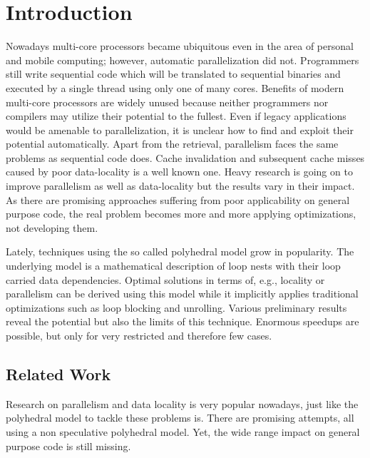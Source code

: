 
\chapter{Introduction} %
\label{Chapter1}



Nowadays multi-core processors became ubiquitous even in the area of personal and 
mobile computing; however, automatic parallelization did not. 
Programmers still write sequential code which will be
translated to sequential binaries and executed by a single thread using only
one of many cores. %
Benefits of modern multi-core processors are widely unused because neither programmers 
nor compilers may utilize their potential to the fullest.
Even if legacy applications would be amenable to parallelization, it is unclear 
how to find and exploit their potential automatically.  
Apart from the retrieval, parallelism faces the same problems as sequential
code does. Cache invalidation and subsequent cache misses 
caused by poor data-locality is a well known one. 
Heavy research is going on to improve parallelism as well as  data-locality 
but the results vary in their impact.
As there are promising approaches suffering from poor applicability on general 
purpose code, the real problem becomes more and more applying optimizations, not
developing them. 


Lately, techniques using the so called polyhedral model grow in popularity.
The underlying model is a mathematical description of loop nests with 
their loop carried data dependencies. Optimal solutions in terms of, e.g.,
locality or parallelism can be derived using this model while it implicitly
applies traditional optimizations such as loop blocking and unrolling. 
Various preliminary results reveal the potential but also the
limits of this technique. Enormous speedups are possible, 
but only for very restricted and therefore few cases.



\section{Related Work}
Research on parallelism and data locality is very popular nowadays, just like the 
polyhedral model to tackle these problems is. There are
promising attempts, all using a non speculative polyhedral model. Yet,
the wide range impact on general purpose code is still missing.

